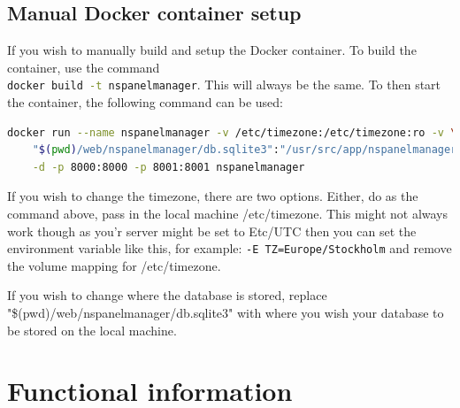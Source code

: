\documentclass[10pt]{article}
\begin{document}
    \subsection{Manual Docker container setup}
    If you wish to manually build and setup the Docker container. To build the container, use the command \\ \lstinline[language=bash]{docker build -t nspanelmanager}. This will always be the same. To then start the container, the following command can be used:
    \begin{lstlisting}[language=bash]
    docker run --name nspanelmanager -v /etc/timezone:/etc/timezone:ro -v \
    "$(pwd)/web/nspanelmanager/db.sqlite3":"/usr/src/app/nspanelmanager/db.sqlite3" \
    -d -p 8000:8000 -p 8001:8001 nspanelmanager
    \end{lstlisting}
    If you wish to change the timezone, there are two options. Either, do as the command above, pass in the local machine /etc/timezone. This might not always work though as you'r server might be set to Etc/UTC then you can set the environment variable like this, for example: \lstinline[language=bash]{-E TZ=Europe/Stockholm} and remove the volume mapping for /etc/timezone.

    If you wish to change where the database is stored, replace "\$(pwd)/web/nspanelmanager/db.sqlite3" with where you wish your database to be stored on the local machine.


    \clearpage
    \section{Functional information}
\end{document}
